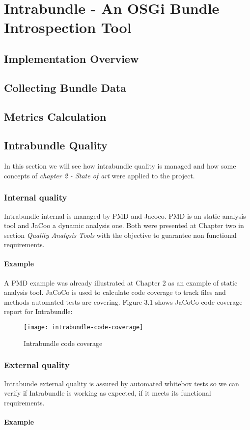 \chapter{Intrabundle - An OSGi Bundle Introspection Tool}

\section{Implementation Overview}

\section{Collecting Bundle Data}

\section{Metrics Calculation}

\section{Intrabundle Quality}
In this section we will see how intrabundle quality is managed and how some concepts of \textit{chapter 2 - State of art} were applied to the project.
\subsection{Internal quality}
Intrabundle internal is managed by PMD and Jacoco. PMD is an static analysis tool and JaCoo a dynamic analysis one. Both were presented at Chapter two in section \textit{Quality Analysis Tools} with the objective to guarantee non functional requirements.

\subsubsection{Example}
 A PMD example was already illustrated at Chapter 2 as an example of static analysis tool. JaCoCo is used to calculate code coverage to track files and methods automated tests are covering. Figure 3.1 shows JaCoCo code coverage report for Intrabundle:

\begin{figure}[h]
\caption{Intrabundle code coverage}
\texttt{[image: intrabundle-code-coverage]}
\end{figure}

\FloatBarrier

\subsection{External quality}
Intrabunde external quality is assured by automated whitebox tests so we can verify if Intrabundle is working as expected, if it meets its functional requirements.

\subsubsection{Example}




